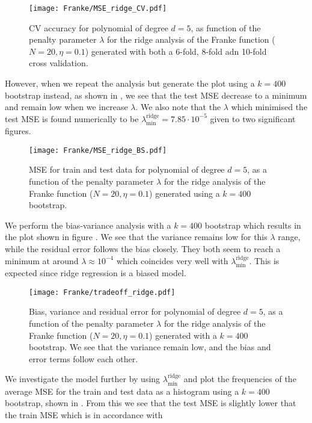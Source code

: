         \begin{figure}
            \texttt{[image: Franke/MSE\_ridge\_CV.pdf]}
            \caption{CV accuracy for polynomial of degree $d=5$, as function of the penalty parameter $\lambda$ for the ridge analysis of the Franke function ($N=20, \eta=0.1$) generated with both a 6-fold, 8-fold adn 10-fold cross validation.}
            \label{fig:cross-validation_ridge}
        \end{figure}

        However, when we repeat the analysis but generate the plot using a $k=400$ bootstrap instead, as shown in , we see that the test MSE decrease to a minimum and remain low when we increase $\lambda$. We also note that the $\lambda$ which minimised the test MSE is found numerically to be $\lambda_\mathrm{min}^\mathrm{ridge} = 7.85\cdot10^{-5}$ given to two significant figures. 


        \begin{figure}
            \texttt{[image: Franke/MSE\_ridge\_BS.pdf]}
            \caption{MSE for train and test data for polynomial of degree $d=5$, as a function of the penalty parameter $\lambda$ for the ridge analysis of the Franke function ($N=20, \eta=0.1$) generated using a $k=400$ bootstrap. }
            \label{fig:bootstrapping_ridge}
        \end{figure}

        We perform the bias-variance analysis with a $k=400$ bootstrap which results in the plot shown in figure . We see that the variance remains low for this $\lambda$ range, while the residual error follows the bias closely. They both seem to reach a minimum at around $\lambda\approx 10^{-4}$ which coincides very well with $\lambda^\mathrm{ridge}_\mathrm{min}$. This is expected since ridge regression is a biased model. 

        \begin{figure}
            \texttt{[image: Franke/tradeoff\_ridge.pdf]}
            \caption{Bias, variance and residual error for polynomial of degree $d=5$, as a function of the penalty parameter $\lambda$ for the ridge analysis of the Franke function ($N=20, \eta=0.1$) generated with a $k=400$ bootstrap. We see that the variance remain low, and the bias and error terms follow each other.}
            \label{fig:bias_variance_ridge}
        \end{figure}

        We investigate the model further by using $\lambda^\mathrm{ridge}_\mathrm{min}$ and plot the frequencies of the average MSE for the train and test data as a histogram using a $k=400$ bootstrap, shown in . From this we see that the test MSE is slightly lower that the train MSE which is in accordance with 

